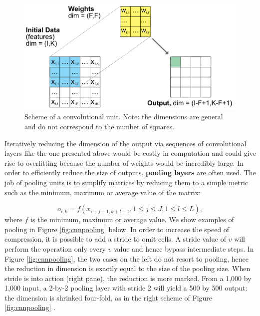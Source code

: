 \documentclass[]{krantz}
\theoremstyle{definition}
\theoremstyle{definition}
\theoremstyle{definition}
\theoremstyle{remark}
\begin{document}
\begin{figure}[H]

{\centering \includegraphics[width=480px]{images/cnn_scheme} 

}

\caption{Scheme of a convolutional unit. Note: the dimensions are general and do not correspond to the number of squares.}\label{fig:cnnscheme}
\end{figure}

Iteratively reducing the dimension of the output via sequences of
convolutional layers like the one presented above would be costly in
computation and could give rise to overfitting because the number of
weights would be incredibly large. In order to efficiently reduce the
size of outputs, \textbf{pooling layers} are often used. The job of
pooling units is to simplify matrices by reducing them to a simple
metric such as the minimum, maximum or average value of the matrix:

\[o_{i,k}=f(x_{i+j-1,k+l-1}, 1\le j\le J, 1 \le l\le L),\] where \(f\)
is the minimum, maximum or average value. We show examples of pooling in
Figure \ref{fig:cnnpooling} below. In order to increase the speed of
compression, it is possible to add a stride to omit cells. A stride
value of \(v\) will perform the operation only every \(v\) value and
hence bypass intermediate steps. In Figure \ref{fig:cnnpooling}, the two
cases on the left do not resort to pooling, hence the reduction in
dimension is exactly equal to the size of the pooling size. When stride
is into action (right pane), the reduction is more marked. From a 1,000
by 1,000 input, a 2-by-2 pooling layer with stride 2 will yield a 500 by
500 output: the dimension is shrinked four-fold, as in the right scheme
of Figure \ref{fig:cnnpooling} .
\end{document}
